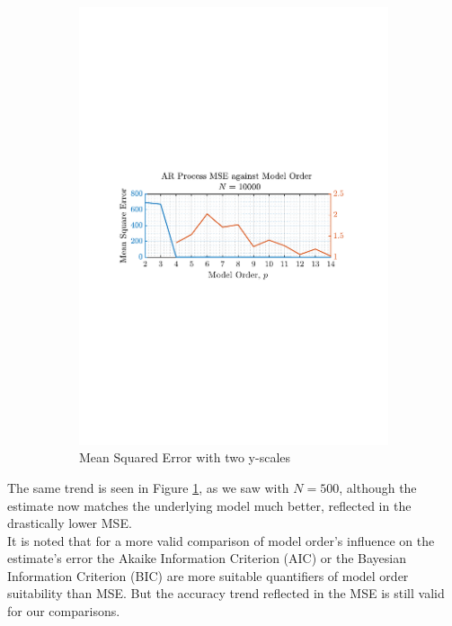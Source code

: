 \documentclass[12pt]{article}
\begin{document}
\begin{figure}[H]
\begin{subfigure}{0.49\textwidth}
			\includegraphics[trim={2.2cm 11.2cm 3cm  11.2cm}, clip, width=\textwidth]{../MATLAB/figures/q1_4c_fig16.pdf} 
			\captionsetup{justification=centering}
			\caption{Mean Squared Error with two y-scales}
		\end{subfigure}
		\captionsetup{justification=centering}
		\caption{}
		\label{fig: 1-4c}
	\end{figure}

	The same trend is seen in Figure \ref{fig: 1-4c}, as we saw with $N=500$, although the estimate now matches the underlying model much better, reflected in the drastically lower MSE. \\
	
	It is noted that for a more valid comparison of model order's influence on the estimate's error the Akaike Information Criterion (AIC) or the Bayesian Information Criterion (BIC) are more suitable quantifiers of model order suitability than MSE. But the accuracy trend reflected in the MSE is still valid for our comparisons.
	
\end{document}
